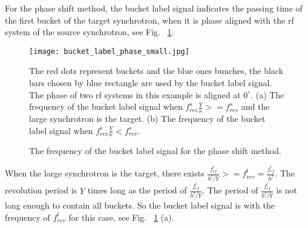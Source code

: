 For the phase shift method, the bucket label signal indicates the passing time of the first bucket of the target synchrotron, when it is phase aligned with the rf system of the source synchrotron, see Fig. ~\ref{bucket_label_phase_small}.  
\begin{figure}[!htb]
   \centering   
   \texttt{[image: bucket\_label\_phase\_small.jpg]}
   \caption{The frequency of the bucket label signal for the phase shift method.}{The red dots represent buckets and the blue ones bunches, the black bars chosen by blue rectangle are used by the bucket label signal. The phase of two rf systems in this example is aligned at $0^\circ$. (a) The frequency of the bucket label signal when $f_{\mathit{rev}}^{s}\frac{Y}{\kappa}>=f_{\mathit{rev}}^{s}$ and the large synchrotron is the target. (b) The frequency of the bucket label signal when $f_{\mathit{rev}}^{s}\frac{Y}{\kappa}<f_{\mathit{rev}}^{s}$.}
   \label{bucket_label_phase_small}
\end{figure}

When the large synchrotron is the target, there exists $\frac{f_{\mathit{rf}}^{l}}{h^l/Y}>=f_{\mathit{rev}}^{l}=\frac{f_{\mathit{rf}}^{l}}{h^l}$. The revolution period is $Y$ times long as the period of $\frac{f_{\mathit{rf}}^{l}}{h^l/Y}$. The period of $\frac{f_{\mathit{rf}}^{l}}{h^l/Y}$ is not long enough to contain all buckets. So the bucket label signal is with the frequency of $f_{\mathit{rev}}^{l}$ for this case, see Fig. ~\ref{bucket_label_phase_small} (a). 

